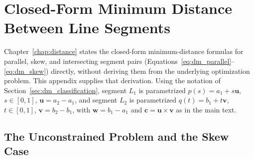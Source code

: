 \chapter{Closed-Form Minimum Distance Between Line Segments}
\label{app:distance}

Chapter~\ref{chap:distance} states the closed-form minimum-distance formulas for parallel, skew, and
intersecting segment pairs (Equations~\eqref{eq:dm_parallel}--\eqref{eq:dm_skew}) directly, without
deriving them from the underlying optimization problem. This appendix supplies that derivation. Using
the notation of Section~\ref{sec:dm_classification}, segment $L_1$ is parametrized $p(s) = a_1 +
s\mathbf{u}$, $s\in[0,1]$, $\mathbf{u} = a_2-a_1$, and segment $L_2$ is parametrized $q(t) = b_1 +
t\mathbf{v}$, $t\in[0,1]$, $\mathbf{v} = b_2-b_1$, with $\mathbf{w} = b_1-a_1$ and $\mathbf{c} =
\mathbf{u}\times\mathbf{v}$ as in the main text.

\section{The Unconstrained Problem and the Skew Case}\label{sec:appB_skew}

